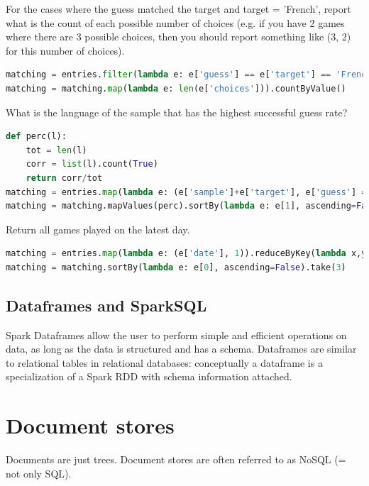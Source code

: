 \documentclass[11pt,oneside,a4paper]{article}
\begin{document}
For the cases where the guess matched the target and target = 'French', report what is the count of each possible number of choices (e.g. if you have 2 games where there are 3 possible choices, then you should report something like (3, 2) for this number of choices). 

\begin{lstlisting}[language=Python,basicstyle=\small,columns=flexible]
matching = entries.filter(lambda e: e['guess'] == e['target'] == 'French')
matching = matching.map(lambda e: len(e['choices'])).countByValue()
\end{lstlisting}

What is the language of the sample that has the highest successful guess rate?

\begin{lstlisting}[language=Python,basicstyle=\small,columns=flexible]
def perc(l):
    tot = len(l)
    corr = list(l).count(True)
    return corr/tot
matching = entries.map(lambda e: (e['sample']+e['target'], e['guess'] == e['target'])).groupByKey()
matching = matching.mapValues(perc).sortBy(lambda e: e[1], ascending=False).take(3)
\end{lstlisting}

Return all games played on the latest day.

\begin{lstlisting}[language=Python,basicstyle=\small,columns=flexible]
matching = entries.map(lambda e: (e['date'], 1)).reduceByKey(lambda x,y: x+y)
matching = matching.sortBy(lambda e: e[0], ascending=False).take(3)
\end{lstlisting}

\subsection{Dataframes and SparkSQL}

Spark Dataframes allow the user to perform simple and efficient operations on data, as long as the data is structured and has a schema. Dataframes are similar to relational tables in relational databases: conceptually a dataframe is a specialization of a Spark RDD with schema information attached. 

\newpage

\section{Document stores}

Documents are just trees. Document stores are often referred to as NoSQL (= not only SQL).\\
\end{document}
